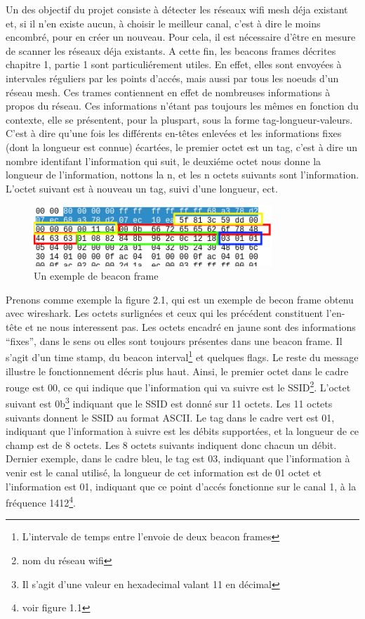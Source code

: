Un des objectif du projet consiste à détecter les réseaux wifi mesh déja existant et, si il n'en existe aucun, à choisir le
meilleur canal, c'est à dire le moins encombré, pour en créer un nouveau. Pour cela, il est nécessaire d'être en mesure de scanner
les réseaux déja existants. A cette fin, les beacons frames décrites chapitre 1, partie 1 sont particuliérement utiles. En effet,
elles sont envoyées à intervales réguliers par les points d'accés, mais aussi par tous les noeuds d'un réseau mesh. Ces trames 
contiennent en effet de nombreuses informations à propos du réseau. Ces informations n'étant pas toujours les mêmes en fonction du 
contexte, elle se présentent, pour la pluspart, sous la forme tag-longueur-valeurs. C'est à dire qu'une fois les différents en-têtes 
enlevées et les informations fixes (dont la longueur est connue) écartées, le premier octet est un tag, c'est à dire un nombre 
identifant l'information qui suit, le deuxiéme octet nous donne la longueur de l'information, nottons la n, et les n octets suivants
sont l'information. L'octet suivant est à nouveau un tag, suivi d'une longueur, ect.

\begin{figure}
   \centering
   \includegraphics[width=0.8\textwidth,natwidth=610,natheight=642]{images/beacon_frame.png}
   \caption{Un exemple de beacon frame}
\end{figure}

Prenons comme exemple la figure 2.1, qui est un exemple de becon frame obtenu avec wireshark. Les octets surlignées et ceux qui
les précédent constituent l'en-tête et ne nous interessent pas. Les octets encadré en jaune sont des informations ``fixes'', dans
le sens ou elles sont toujours présentes dans une beacon frame. Il s'agit d'un time stamp, du beacon interval\footnote{L'intervale
de temps entre l'envoie de deux beacon frames} et quelques flags. Le reste du message illustre le fonctionnement décris plus
haut. Ainsi, le premier octet dans le cadre rouge est 00, ce qui indique que l'information qui va suivre est le SSID\footnote{nom du
réseau wifi}. L'octet suivant est 0b\footnote{Il s'agit d'une valeur en hexadecimal valant 11 en décimal} indiquant que le SSID est
donné sur 11 octets. Les 11 octets suivants donnent le SSID au format ASCII. Le tag dans le cadre vert est 01, indiquant que 
l'information à suivre est les débits supportées, et la longueur de ce champ est de 8 octets. Les 8 octets suivants indiquent donc 
chacun un débit. Dernier exemple, dans le cadre bleu, le tag est 03, indiquant que l'information à venir est le canal utilisé, la 
longueur de cet information est de 01 octet et l'information est 01, indiquant que ce point d'accés fonctionne sur le canal 1, à la
fréquence 1412\footnote{voir figure 1.1}.

